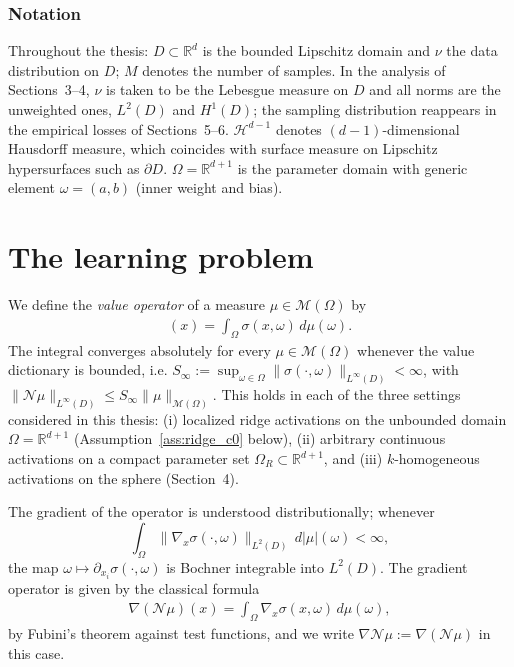\documentclass[11pt]{amsart}
\theoremstyle{definition}
\theoremstyle{remark}
\begin{document}
\subsubsection*{Notation}
Throughout the thesis: $D \subset \mathbb{R}^d$ is the bounded Lipschitz domain
and $\nu$ the data distribution on $D$; $M$ denotes the number of samples.
In the analysis of Sections~3--4, $\nu$ is taken to be the Lebesgue measure on
$D$ and all norms are the unweighted ones, $L^2(D)$ and $H^1(D)$; the sampling
distribution reappears in the empirical losses of Sections~5--6.
$\mathcal{H}^{d-1}$ denotes $(d-1)$-dimensional Hausdorff measure, which
coincides with surface measure on Lipschitz hypersurfaces such as $\partial D$.
$\Omega = \mathbb{R}^{d+1}$ is the parameter domain with generic element
$\omega = (a, b)$ (inner weight and bias).



\section{The learning problem}
We define the \emph{value operator} of a measure $\mu \in \mathcal{M}(\Omega)$ by
\begin{align*}
	[\mathcal{N}\mu] (x) = \int_\Omega \sigma (x, \omega) \, d\mu(\omega).
\end{align*}
The integral converges absolutely for every $\mu \in \mathcal{M}(\Omega)$
whenever the value dictionary is bounded, i.e.
$S_\infty := \sup_{\omega \in \Omega} \|\sigma(\cdot, \omega)\|_{L^\infty(D)} < \infty$,
with $\|\mathcal{N}\mu\|_{L^\infty(D)} \le S_\infty \|\mu\|_{\mathcal{M}(\Omega)}$.
This holds in each of the three settings considered in this thesis:
(i) localized ridge activations on the unbounded domain $\Omega = \mathbb{R}^{d+1}$
(Assumption~\ref{ass:ridge_c0} below), (ii) arbitrary continuous activations on a
compact parameter set $\Omega_R \subset \mathbb{R}^{d+1}$, and (iii)
$k$-homogeneous activations on the sphere (Section~4).\par 
The gradient of the operator is understood distributionally; whenever
\begin{equation*}
	\tag{B}\label{bochner}
	\int_\Omega \|\nabla_x \sigma(\cdot, \omega)\|_{L^2(D)} \, d|\mu|(\omega) < \infty,
\end{equation*}
the map $\omega \mapsto \partial_{x_i}\sigma(\cdot,\omega)$ is Bochner integrable into $L^2(D)$.
The gradient operator is given by the classical formula
\begin{align*}
	\nabla (\mathcal{N}\mu)(x) = \int_\Omega \nabla_x \sigma(x, \omega) \, d\mu(\omega),
\end{align*}
by Fubini's theorem against test functions, and we write
$\nabla \mathcal{N} \mu := \nabla(\mathcal{N}\mu)$ in this case.
\end{document}
